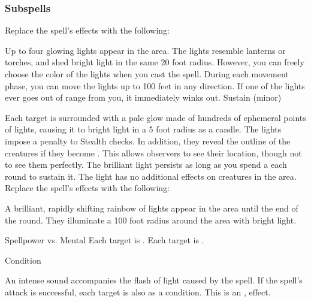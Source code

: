 \subsubsection{Subspells}
Replace the spell's effects with the following:
\begin{spellcontent}
\begin{augmenteffects}
\spelleffect
Up to four glowing lights appear in the area.
The lights resemble lanterns or torches, and shed bright light in the same 20 foot radius.
However, you can freely choose the color of the lights when you cast the spell.
During each movement phase, you can move the lights up to 100 feet in any direction.
If one of the lights ever goes out of range from you, it immediately winks out.
\spelldur Sustain (minor)
\end{augmenteffects}
\end{spellcontent}
Each target is surrounded with a pale glow made of hundreds of ephemeral points of lights, causing it to bright light in a 5 foot radius as a candle.
The lights impose a  penalty to Stealth checks.
In addition, they reveal the outline of the creatures if they become .
This allows observers to see their location, though not to see them perfectly.
The brilliant light persists as long as you spend a  each round to sustain it.
The light has no additional effects on creatures in the area.
Replace the spell's effects with the following:
\begin{spellcontent}
\begin{augmenteffects}
\spelleffect
A brilliant, rapidly shifting rainbow of lights appear in the area until the end of the round.
They illuminate a 100 foot radius around the area with bright light.
\begin{spellattack}{Spellpower vs. Mental}
\spellsuccess
Each target is \disoriented.
\spellcritical
Each target is \confused.
\end{spellattack}
\spelldur Condition
\end{augmenteffects}
\end{spellcontent}
An intense sound accompanies the flash of light caused by the spell.
If the spell's attack is successful, each target is also \deafened as a condition.
This is an ,  effect.
